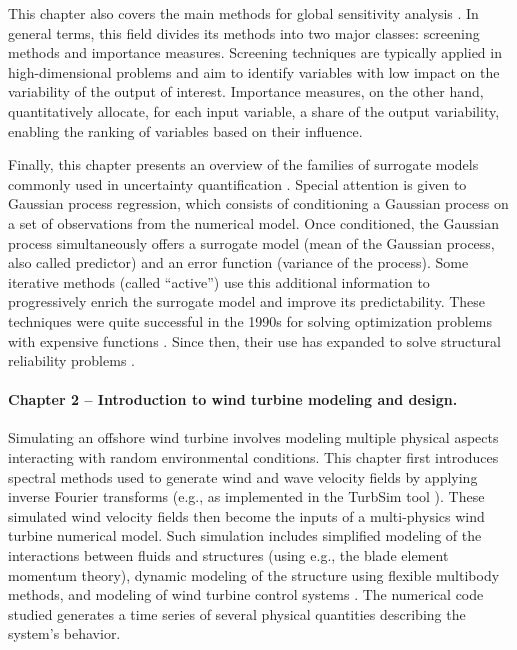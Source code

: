 This chapter also covers the main methods for global sensitivity analysis \citep{daveiga_iooss_2021}. 
In general terms, this field divides its methods into two major classes: screening methods and importance measures. 
Screening techniques are typically applied in high-dimensional problems and aim to identify variables with low impact on the variability of the output of interest. 
Importance measures, on the other hand, quantitatively allocate, for each input variable, a share of the output variability, enabling the ranking of variables based on their influence.

Finally, this chapter presents an overview of the families of surrogate models commonly used in uncertainty quantification \citep{forrester_2008}. 
Special attention is given to Gaussian process regression, which consists of conditioning a Gaussian process on a set of observations from the numerical model. 
Once conditioned, the Gaussian process simultaneously offers a surrogate model (mean of the Gaussian process, also called predictor) and an error function (variance of the process). 
Some iterative methods (called ``active'') use this additional information to progressively enrich the surrogate model and improve its predictability. 
These techniques were quite successful in the 1990s for solving optimization problems with expensive functions \citep{jones_1998}. 
Since then, their use has expanded to solve structural reliability problems \citep{echard_2011}.


\paragraph{Chapter 2 -- Introduction to wind turbine modeling and design.} 
Simulating an offshore wind turbine involves modeling multiple physical aspects interacting with random environmental conditions. 
This chapter first introduces spectral methods used to generate wind and wave velocity fields by applying inverse Fourier transforms (e.g., as implemented in the TurbSim tool \citealp{turbsim_2009}). 
These simulated wind velocity fields then become the inputs of a multi-physics wind turbine numerical model. 
Such simulation includes simplified modeling of the interactions between fluids and structures (using e.g., the blade element momentum theory), dynamic modeling of the structure using flexible multibody methods, and modeling of wind turbine control systems \citep{burton_2021_wind_handbook}. 
The numerical code studied generates a time series of several physical quantities describing the system's behavior.

